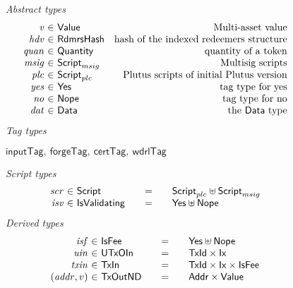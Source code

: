 \begin{figure*}[htb]
  \emph{Abstract types}
  \begin{equation*}
    \begin{array}{r@{~\in~}lr}
      \var{v} &\Value & \text{Multi-asset value}\\
      \var{hdv} &\RdmrsHash & \text{hash of the indexed redeemers structure}\\
      \var{quan} & \Quantity & \text{quantity of a token}\\
      \var{msig} & \ScriptMSig & \text{Multisig scripts} \\
      \var{plc} & \ScriptPlutus & \text{Plutus scripts of initial Plutus version} \\
      \var{yes} & \Yes & \text{tag type for yes} \\
      \var{no} & \Nope & \text{tag type for no} \\
      \var{dat} & \Data & \text{the $\Data$ type} \\
    \end{array}
  \end{equation*}
  \emph{Tag types}
  \begin{center}
    $\mathsf{inputTag},~\mathsf{forgeTag},~\mathsf{certTag},~\mathsf{wdrlTag}$
  \end{center}
  \emph{Script types}
  \begin{equation*}
    \begin{array}{r@{~\in~}l@{\qquad=\qquad}lr}
      \var{scr} & \Script & \ScriptPlutus \uniondistinct \ScriptMSig \\
      \var{isv} & \IsValidating & \Yes \uniondistinct \Nope \\
    \end{array}
  \end{equation*}
%
  \emph{Derived types}
  \begin{equation*}
    \begin{array}{r@{~\in~}l@{\qquad=\qquad}lr}
      \var{isf}
      & \IsFee
      & \Yes \uniondistinct \Nope
      \\
      \var{uin}
      & \UTxOIn
      & \TxId \times \Ix
      \\
      \var{txin}
      & \TxIn
      & \TxId \times \Ix \times \IsFee
      \\
      (\var{addr}, v)
      & \type{TxOutND}
      & \Addr \times \Value

\end{array}
\end{equation*}
\end{figure*}
